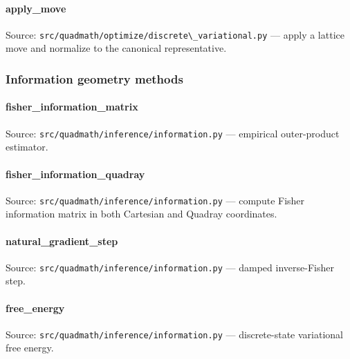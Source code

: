 \documentclass[
  10pt,
]{article}
\newcommand{\passthrough}[1]{#1}
\renewcommand{\texttt}[1]{%
    \colorbox{codebg}{\color{codefg}\ttfamily #1}%
}
\begin{document}
\paragraph{\texorpdfstring{\texttt{apply\_move}}{apply\_move}}\label{code:apply_move}

Source:
\passthrough{\lstinline!src/quadmath/optimize/discrete\_variational.py!}
--- apply a lattice move and normalize to the canonical representative.

\subsubsection{Information geometry
methods}\label{code:information_geometry}

\paragraph{\texorpdfstring{\texttt{fisher\_information\_matrix}}{fisher\_information\_matrix}}\label{code:fisher_information_matrix}

Source: \passthrough{\lstinline!src/quadmath/inference/information.py!}
--- empirical outer-product estimator.

\paragraph{\texorpdfstring{\texttt{fisher\_information\_quadray}}{fisher\_information\_quadray}}\label{code:fisher_information_quadray}

Source: \passthrough{\lstinline!src/quadmath/inference/information.py!}
--- compute Fisher information matrix in both Cartesian and Quadray
coordinates.

\paragraph{\texorpdfstring{\texttt{natural\_gradient\_step}}{natural\_gradient\_step}}\label{code:natural_gradient_step}

Source: \passthrough{\lstinline!src/quadmath/inference/information.py!}
--- damped inverse-Fisher step.

\paragraph{\texorpdfstring{\texttt{free\_energy}}{free\_energy}}\label{code:free_energy}

Source: \passthrough{\lstinline!src/quadmath/inference/information.py!}
--- discrete-state variational free energy.
\end{document}
